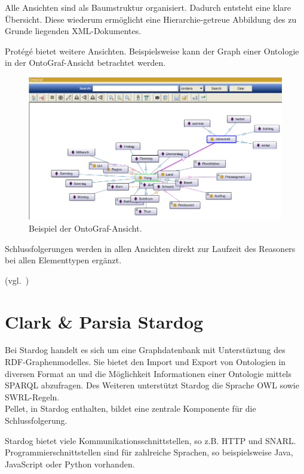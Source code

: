 Alle Ansichten sind als Baumstruktur organisiert. Dadurch entsteht eine klare Übersicht. Diese wiederum ermöglicht eine Hierarchie-getreue Abbildung des zu Grunde liegenden XML-Dokumentes.

Protégé bietet weitere Ansichten. Beispielsweise kann der Graph einer Ontologie in der OntoGraf-Ansicht betrachtet werden.

\begin{figure}[H]%
    \centering
    \includegraphics[scale=0.7]{bilder/OntoGraf.png}
    \caption{Beispiel der OntoGraf-Ansicht.\label{fig:kompo:ontograf}\protect\footnotemark}
\end{figure}

Schlussfolgerungen werden in allen Ansichten direkt zur Laufzeit des Reasoners bei allen Elementtypen ergänzt.

(vgl.~\cite{protegeView})

\section{Clark \& Parsia Stardog}
\label{sec:komponenten_stardog}
Bei Stardog handelt es sich um eine Graphdatenbank mit Unterstüztung des RDF-Graphenmodelles. Sie bietet den Import und Export von Ontologien in diversen Format an und die Möglichkeit Informationen einer Ontologie mittels SPARQL abzufragen. Des Weiteren unterstützt Stardog die Sprache OWL sowie SWRL-Regeln.\\
Pellet, in Stardog enthalten, bildet eine zentrale Komponente für die Schlussfolgerung.

Stardog bietet viele Kommunikationsschnittstellen, so z.B. HTTP und SNARL.\\
Programmierschnittstellen sind für zahlreiche Sprachen, so beispielsweise Java, JavaScript oder Python vorhanden.

